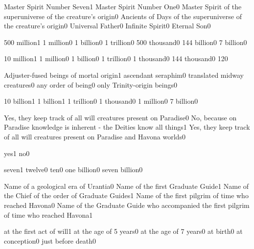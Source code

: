 {Master Spirit Number Seven}{1}
{Master Spirit Number One}{0}
{Master Spirit of the superuniverse of the creature's origin}{0}
{Ancients of Days of the superuniverse of the creature's origin}{0}
{Universal Father}{0}
{Infinite Spirit}{0}
{Eternal Son}{0}
\qstop

{500 million}{1}
{1 million}{0}
{1 billion}{0}
{1 trillion}{0}
{500 thousand}{0}
{144 billion}{0}
{7 billion}{0}
\qstop

{10 million}{1}
{1 million}{0}
{1 billion}{0}
{1 trillion}{0}
{1 thousand}{0}
{144 thousand}{0}
{12}{0}
\qstop

{Adjuster-fused beings of mortal origin}{1}
{ascendant seraphim}{0}
{translated midway creatures}{0}
{any order of being}{0}
{only Trinity-origin beings}{0}
\qstop

{10 billion}{1}
{1 billion}{1}
{1 trillion}{0}
{1 thousand}{0}
{1 million}{0}
{7 billion}{0}
\qstop

{Yes, they keep track of all will creatures present on Paradise}{0}
{No, because on Paradise knowledge is inherent - the Deities know all things}{1}
{Yes, they keep track of all will creatures present on Paradise and Havona worlds}{0}
\qstop

{yes}{1}
{no}{0}
\qstop

{seven}{1}
{twelve}{0}
{ten}{0}
{one billion}{0}
{seven billion}{0}
\qstop

{Name of a geological era of Urantia}{0}
{Name of the first Graduate Guide}{1}
{Name of the Chief of the order of Graduate Guides}{1}
{Name of the first pilgrim of time who reached Havona}{0}
{Name of the Graduate Guide who accompanied the first pilgrim of time who reached Havona}{1}
\qstop

{at the first act of will}{1}
{at the age of 5 years}{0}
{at the age of 7 years}{0}
{at birth}{0}
{at conception}{0}
{just before death}{0}
\qstop

